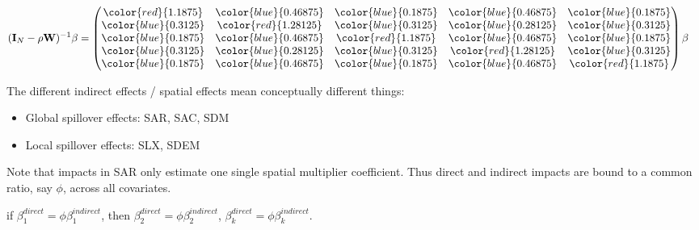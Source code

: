 \documentclass[
  letterpaper,
  DIV=11,
  numbers=noendperiod]{scrreprt}
\begin{document}
\[
\begin{split}
(\boldsymbol{\mathbf{I}}_N - \rho \boldsymbol{\mathbf{W}})^{-1} \beta &=
\begin{pmatrix}
      \color{red}{1.1875} & \color{blue}{0.46875} & \color{blue}{0.1875} & \color{blue}{0.46875} & \color{blue}{0.1875} \\
      \color{blue}{0.3125} & \color{red}{1.28125} & \color{blue}{0.3125} & \color{blue}{0.28125} & \color{blue}{0.3125} \\
      \color{blue}{0.1875} & \color{blue}{0.46875} & \color{red}{1.1875} & \color{blue}{0.46875} & \color{blue}{0.1875} \\
      \color{blue}{0.3125} & \color{blue}{0.28125} & \color{blue}{0.3125} & \color{red}{1.28125} & \color{blue}{0.3125} \\
      \color{blue}{0.1875} & \color{blue}{0.46875} & \color{blue}{0.1875} & \color{blue}{0.46875} & \color{red}{1.1875}
      \end{pmatrix} \beta
\end{split}
\]

The different indirect effects / spatial effects mean conceptually
different things:

\begin{itemize}
\item
  Global spillover effects: SAR, SAC, SDM
\item
  Local spillover effects: SLX, SDEM
\end{itemize}

\begin{tcolorbox}[enhanced jigsaw, opacitybacktitle=0.6, left=2mm, leftrule=.75mm, toptitle=1mm, breakable, colback=white, bottomrule=.15mm, colframe=quarto-callout-warning-color-frame, colbacktitle=quarto-callout-warning-color!10!white, coltitle=black, bottomtitle=1mm, titlerule=0mm, title=\textcolor{quarto-callout-warning-color}{\faExclamationTriangle}\hspace{0.5em}{Common ratio between direct and indirect impacts in SAR and SAC}, opacityback=0, arc=.35mm, rightrule=.15mm, toprule=.15mm]

Note that impacts in SAR only estimate one single spatial multiplier
coefficient. Thus direct and indirect impacts are bound to a common
ratio, say \(\phi\), across all covariates.

if \(\beta_1^{direct} = \phi\beta_1^{indirect}\), then
\(\beta_2^{direct} = \phi\beta_2^{indirect}\),
\(\beta_k^{direct} = \phi\beta_k^{indirect}\).

\end{tcolorbox}
\end{document}
